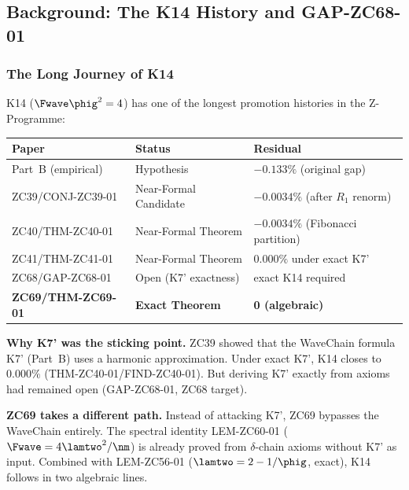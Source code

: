 \documentclass[12pt, a4paper]{article}
\begin{document}
\tableofcontents

\newpage

\subsection{Background: The K14 History and GAP-ZC68-01}
\label{sec:background}

\subsubsection{The Long Journey of K14}

K14 ($\Fwave\phig^{2} = 4$) has one of the longest
promotion histories in the Z-Programme:

\begin{center}
{\small\renewcommand{\arraystretch}{1.30}
\begin{tabular}{@{}lll@{}}
\toprule
Paper & Status & Residual \\
\midrule
Part~B (empirical) & Hypothesis & $-0.133\%$ (original gap) \\
ZC39/CONJ-ZC39-01 & Near-Formal Candidate & $-0.0034\%$ (after $R_1$ renorm) \\
ZC40/THM-ZC40-01 & Near-Formal Theorem & $-0.0034\%$ (Fibonacci partition) \\
ZC41/THM-ZC41-01 & Near-Formal Theorem & $0.000\%$ under exact K7' \\
ZC68/GAP-ZC68-01 & Open (K7' exactness) & exact K14 required \\
\textbf{ZC69/THM-ZC69-01} & \textbf{Exact Theorem} & \textbf{0 (algebraic)} \\
\bottomrule
\end{tabular}
}
\end{center}

\medskip
\textbf{Why K7' was the sticking point.}
ZC39 showed that the WaveChain formula K7' (Part~B)
uses a harmonic approximation. Under exact K7',
K14 closes to $0.000\%$ (THM-ZC40-01/FIND-ZC40-01).
But deriving K7' exactly from axioms had remained
open (GAP-ZC68-01, ZC68 target).

\textbf{ZC69 takes a different path.}
Instead of attacking K7', ZC69 bypasses the WaveChain
entirely. The spectral identity LEM-ZC60-01
($\Fwave = 4\lamtwo^{2}/\nm$) is already proved from
$\delta$-chain axioms without K7' as input.
Combined with LEM-ZC56-01 ($\lamtwo = 2 - 1/\phig$,
exact), K14 follows in two algebraic lines.
\end{document}
